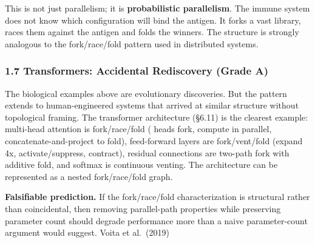\documentclass[
]{article}
\begin{document}
This is not just parallelism; it is \textbf{probabilistic parallelism}.
The immune system does not know which configuration will bind the
antigen. It forks a vast library, races them against the antigen and
folds the winners. The structure is strongly analogous to the
fork/race/fold pattern used in distributed systems.

\subsubsection{\texorpdfstring{\textbf{1.7 Transformers: Accidental
Rediscovery (Grade
A)}}{1.7 Transformers: Accidental Rediscovery (Grade A)}}\label{transformers-accidental-rediscovery-grade-a}

The biological examples above are evolutionary discoveries. But the
pattern extends to human-engineered systems that arrived at similar
structure without topological framing. The transformer architecture
(§6.11) is the clearest example: multi-head attention is fork/race/fold
( heads fork, compute in parallel, concatenate-and-project to fold),
feed-forward layers are fork/vent/fold (expand 4x, activate/suppress,
contract), residual connections are two-path fork with additive fold,
and softmax is continuous venting. The architecture can be represented
as a nested fork/race/fold graph.

\textbf{Falsifiable prediction.} If the fork/race/fold characterization
is structural rather than coincidental, then removing parallel-path
properties while preserving parameter count should degrade performance
more than a naive parameter-count argument would suggest. Voita et
al.~(2019)
\end{document}

